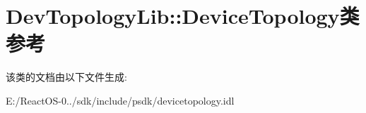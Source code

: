 \hypertarget{class_dev_topology_lib_1_1_device_topology}{}\section{Dev\+Topology\+Lib\+:\+:Device\+Topology类 参考}
\label{class_dev_topology_lib_1_1_device_topology}


该类的文档由以下文件生成\+:\begin{DoxyCompactItemize}
\item 
E\+:/\+React\+O\+S-\/0../sdk/include/psdk/devicetopology.\+idl\end{DoxyCompactItemize}
